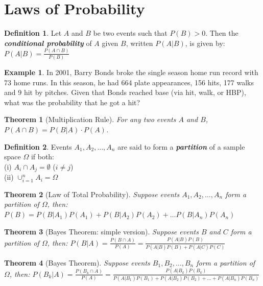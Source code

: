 \documentclass[
]{book}
\newtheorem{theorem}{Theorem}[chapter]
\theoremstyle{definition}
\newtheorem{definition}{Definition}[chapter]
\theoremstyle{definition}
\newtheorem{example}{Example}[chapter]
\theoremstyle{definition}
\theoremstyle{definition}
\theoremstyle{remark}
\begin{document}
\hypertarget{laws-of-probability}{%
\section{Laws of Probability}\label{laws-of-probability}}

\begin{definition}
Let \(A\) and \(B\) be two events such that \(P(B)>0\). Then the \textbf{\emph{conditional probability}} of \(A\) given \(B\), written \(P(A|B)\), is given by:
\(P(A|B) = \frac{P(A \cap B)}{P(B)}\)
\end{definition}

\begin{example}
In 2001, Barry Bonds broke the single season home run record with 73 home runs. In this season, he had 664 plate appearances, 156 hits, 177 walks and 9 hit by pitches. Given that Bonds reached base (via hit, walk, or HBP), what was the probability that he got a hit?
\end{example}

\hfill\break
\hfill\break
\hfill\break

\begin{theorem}[Multiplication Rule]
For any two events \(A\) and \(B\), \(P(A \cap B) = P(B|A) \cdot P(A)\).
\end{theorem}

\begin{definition}
Events \(A_1, A_2, \ldots, A_n\) are said to form a \textbf{\emph{partition}} of a sample space \(\Omega\) if both:\\
(i) \(A_i \cap A_j = \emptyset\) (\(i \neq j\))\\
(ii) \(\cup_{i=1}^n A_i = \Omega\)\\
\end{definition}

\begin{theorem}[Law of Total Probability]
Suppose events \(A_1, A_2, \ldots, A_n\) form a partition of \(\Omega\), then:
\(P(B) = P(B|A_1)P(A_1) + P(B|A_2)P(A_2) + \ldots P(B|A_n)P(A_n)\)
\end{theorem}

\begin{theorem}[Bayes Theorem: simple version]
Suppose events \(B\) and \(C\) form a partition of \(\Omega\), then:
\(P(B|A) = \frac{P(B \cap A)}{P(A)} = \frac{P(A|B)P(B)}{P(A|B)P(B)+P(A|C)P(C)}\)
\end{theorem}

\begin{theorem}[Bayes Theorem]
Suppose events \(B_1, B_2, \ldots, B_n\) form a partition of \(\Omega\), then:
\(P(B_k|A) = \frac{P(B_k \cap A)}{P(A)} = \frac{P(A|B_k)P(B_k)}{P(A|B_1)P(B_1)+P(A|B_2)P(B_2) + \ldots + P(A|B_n)P(B_n)}\)
\end{theorem}
\end{document}
